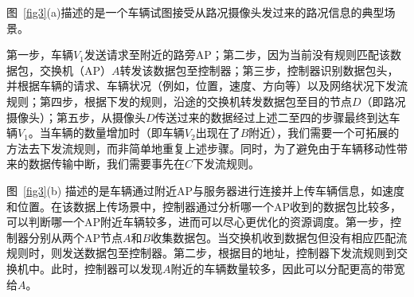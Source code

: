 图~\ref{fig3}(a)描述的是一个车辆试图接受从路况摄像头发过来的路况信息的典型场景。


第一步，车辆$V_{1}$发送请求至附近的路旁AP；第二步，因为当前没有规则匹配该数据包，交换机（AP）$A$转发该数据包至控制器；第三步，控制器识别数据包头，并根据车辆的请求、车辆状况（例如，位置，速度、方向等）以及网络状况下发流规则；第四步，根据下发的规则，沿途的交换机转发数据包至目的节点$D$（即路况摄像头）；第五步，从摄像头$D$传送过来的数据经过上述二至四的步骤最终到达车辆$V_{1}$。当车辆的数量增加时（即车辆$V_{2}$出现在了$B$附近），我们需要一个可拓展的方法去下发流规则，而非简单地重复上述步骤。同时，为了避免由于车辆移动性带来的数据传输中断，我们需要事先在$C$下发流规则。


图~\ref{fig3}(b) 描述的是车辆通过附近AP与服务器进行连接并上传车辆信息，如速度和位置。在该数据上传场景中，控制器通过分析哪一个AP收到的数据包比较多，可以判断哪一个AP附近车辆较多，进而可以尽心更优化的资源调度。第一步，控制器分别从两个AP节点$A$和$B$收集数据包。当交换机收到数据包但没有相应匹配流规则时，则发送数据包至控制器。第二步，根据目的地址，控制器下发流规则到交换机中。此时，控制器可以发现$A$附近的车辆数量较多，因此可以分配更高的带宽给$A$。


